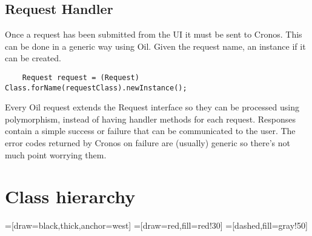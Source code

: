 \documentclass[a4paper, 11pt, titlepage]{article}
\begin{document}
	\subsection{Request Handler}
	Once a request has been submitted from the UI it must be sent to Cronos. This can be done in a generic way using Oil. Given the request name, an instance if it can be created.
	\begin{verbatim}
	Request request = (Request) Class.forName(requestClass).newInstance();
	\end{verbatim}
	Every Oil request extends the Request interface so they can be processed using polymorphism, instead of having handler methods for each request. Responses contain a simple success or failure that can be communicated to the user. The error codes returned by Cronos on failure are (usually) generic so there's not much point worrying them.

\section{Class hierarchy}

=[draw=black,thick,anchor=west]
=[draw=red,fill=red!30]
=[dashed,fill=gray!50]


 

 
 
 
\end{document}

